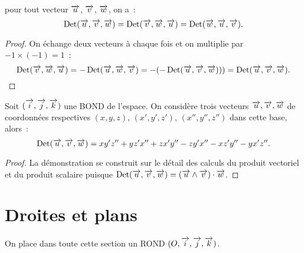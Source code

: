 \begin{cor}
  pour tout vecteur \(\vu\), \(\vv\), \(\vw\), on a~:
  \begin{equation}
    \Det(\vu, \vv, \vw) = \Det(\vv, \vw, \vu) = \Det(\vw, \vu, \vv).
  \end{equation}
\end{cor}

\begin{proof}
  On échange deux vecteurs à chaque fois et on multiplie par \(-1\times(-1) = 
  1\)~:
  \begin{equation}
    \Det(\vv, \vw, \vu) = -\Det(\vu, \vw, \vv) = -(-\Det(\vu, \vv, \vw))) = 
    \Det(\vu, \vv, \vw).
  \end{equation}
\end{proof}

\begin{prop}
  Soit \(\bondtrois\) une BOND de l'espace. On considère trois vecteurs \(\vu, 
  \vv, \vw\) de coordonnées respectives \((x, y, z)\), \((x', y', z')\), 
  \((x'', y'', z'')\) dans cette base, alors~:
  \begin{equation}
    \Det(\vu, \vv, \vw) = xy'z'' + yz'x'' + zx'y'' - zy'x'' - xz'y'' - yx'z''.
  \end{equation}
\end{prop}

\begin{proof}
  La démonstration se construit sur le détail des calculs du produit vectoriel 
  et du produit scalaire puisque \(\Det(\vu, \vv, \vw) = 
  (\vu\wedge\vv)\cdot\vw\).
\end{proof}

\section{Droites et plans}
On place dans toute cette section un ROND \(\rondtrois\).

